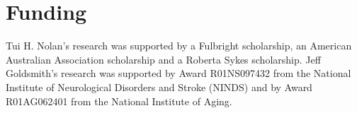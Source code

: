 \documentclass[12pt]{article}
\theoremstyle{plain}
\theoremstyle{definition}
\theoremstyle{remark}
\begin{document}
	\section*{Funding}
	
	Tui H. Nolan's research was supported by a Fulbright scholarship, an American Australian Association
	scholarship and a Roberta Sykes scholarship. Jeff Goldsmith's research was supported by Award
	R01NS097432 from the National Institute of Neurological Disorders and Stroke (NINDS) and by Award
	R01AG062401 from the National Institute of Aging.
	
\fi



\end{document}

